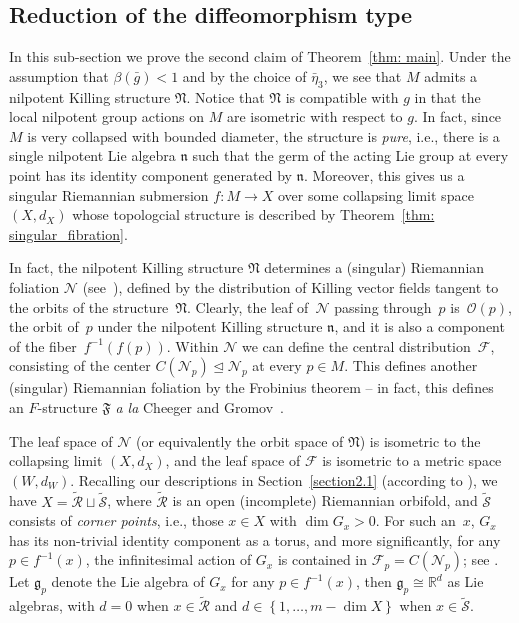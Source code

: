 \documentclass[pdftex]{sigma}
\numberwithin{equation}{section}
\begin{document}
\subsection{Reduction of the diffeomorphism type}\label{section5.2}
In this sub-section we prove the second claim of Theorem~\ref{thm: main}.
Under the assumption that $\beta(\bar{g})<1$ and by the choice of
$\bar{\eta}_3$, we see that $M$ admits a nilpotent Killing structure
$\mathfrak{N}$. Notice that $\mathfrak{N}$ is compatible with $g$ in that
the local nilpotent group actions on $M$ are isometric with respect to $g$. In
fact, since $M$ is very collapsed with bounded diameter, the structure is
\emph{pure}, i.e., there is a single nilpotent Lie algebra $\mathfrak{n}$ such
that the germ of the acting Lie group at every point has its identity component
generated by $\mathfrak{n}$. Moreover, this gives us a singular Riemannian
submersion $f\colon M\to X$ over some collapsing limit space~$(X,d_X)$ whose
topologcial structure is described by Theorem~\ref{thm: singular_fibration}.

In fact, the nilpotent Killing structure $\mathfrak{N}$ determines a (singular)
Riemannian foliation $\mathcal{N}$ (see~\cite{Molino88}), defined by the
distribution of Killing vector fields tangent to the orbits of the structure~$\mathfrak{N}$. Clearly, the leaf of~$\mathcal{N}$ passing through~$p$ is~$\mathcal{O}(p)$, the orbit of~$p$ under the nilpotent Killing structure
$\mathfrak{n}$, and it is also a component of the fiber~$f^{-1}(f(p))$. Within
$\mathcal{N}$ we can define the central distribution~$\mathcal{F}$, consisting
of the center $C(\mathcal{N}_p)\trianglelefteq \mathcal{N}_p$ at every $p\in
M$. This defines another (singular) Riemannian foliation by the Frobinius
theorem -- in fact, this defines an $F$-structure $\mathfrak{F}$ \emph{a la}
Cheeger and Gromov~\cite{CGI, CGII}.

The leaf space of $\mathcal{N}$ (or equivalently the orbit space of
$\mathfrak{N}$) is isometric to the collapsing limit $(X,d_X)$, and the
leaf space of $\mathcal{F}$ is isometric to a metric space $(W,d_W)$. Recalling
our descriptions in Section~\ref{section2.1} (according to \cite[Theorem~0.5]{Fukaya88}), we have
$X=\tilde{\mathcal{R}}\sqcup \tilde{\mathcal{S}}$, where $\tilde{\mathcal{R}}$
is an open (incomplete) Riemannian orbifold, and $\tilde{\mathcal{S}}$ consists
of \emph{corner points}, i.e., those $x\in X$ with $\dim G_x>0$. For such an~$x$,
 $G_x$ has its non-trivial identity component as a torus, and more
 significantly, for any $p\in f^{-1}(x)$, the infinitesimal action of $G_x$ is
 contained in $\mathcal{F}_p=C(\mathcal{N}_p)$; see \cite[Lemma~5.1]{Fukaya88}.
 Let $\mathfrak{g}_p$ denote the Lie algebra of $G_x$ for any $p\in f^{-1}(x)$,
 then $\mathfrak{g}_p\cong \mathbb{R}^d$ as Lie algebras, with $d=0$ when $x\in
 \tilde{\mathcal{R}}$ and $d\in \left\{1,\ldots,m-\dim X\right\}$ when $x\in
 \tilde{\mathcal{S}}$.
\end{document}
